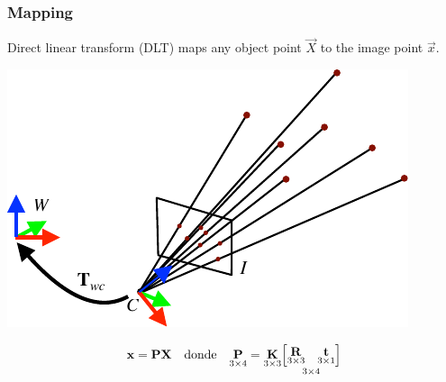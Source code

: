 \begin{frame}
  \frametitle{Mapping}
  Direct linear transform (DLT) maps any object point $\vec{X}$ to the image point $\vec{x}$.
  \begin{center}
    \includegraphics[width=0.5\columnwidth]{./images/dlt_3d_2d.pdf}
  \end{center}
%
  \begin{equation*}
    \boldsymbol{\mathbf{x}} = \boldsymbol{\mathbf{P}} \boldsymbol{\mathbf{X}} \quad \text{donde} \quad
    \underset{3 \times 4}{\boldsymbol{\mathbf{P}}}=\underset{3 \times 3}{\boldsymbol{\mathbf{K}}}\underset{3 \times 4}{\begin{bmatrix} \underset{3 \times 3}{\boldsymbol{\mathbf{R}}} & \underset{3 \times 1}{\boldsymbol{\mathbf{t}}}\end{bmatrix}}
  \end{equation*}
%
\end{frame}



